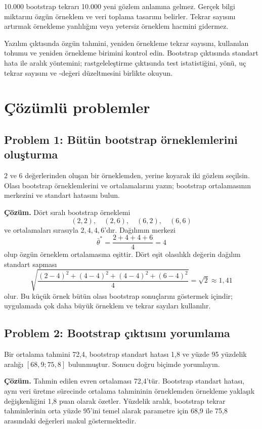 \begin{mistakebox}
10.000 bootstrap tekrarı 10.000 yeni gözlem anlamına gelmez. Gerçek bilgi
miktarını özgün örneklem ve veri toplama tasarımı belirler. Tekrar sayısını
artırmak örnekleme yanlılığını veya yetersiz örneklem hacmini gidermez.
\end{mistakebox}

\begin{outputguidebox}
Yazılım çıktısında özgün tahmini, yeniden örnekleme tekrar sayısını, kullanılan
tohumu ve yeniden örnekleme birimini kontrol edin. Bootstrap çıktısında
standart hata ile aralık yöntemini; rastgeleleştirme çıktısında test
istatistiğini, yönü, uç tekrar sayısını ve \pval-değeri düzeltmesini birlikte
okuyun.
\end{outputguidebox}

\section{Çözümlü problemler}

\subsection*{Problem 1: Bütün bootstrap örneklemlerini oluşturma}

$2$ ve $6$ değerlerinden oluşan bir örneklemden, yerine koyarak iki gözlem
seçilsin. Olası bootstrap örneklemlerini ve ortalamalarını yazın; bootstrap
ortalamasının merkezini ve standart hatasını bulun.

\textbf{Çözüm.} Dört sıralı bootstrap örneklemi
\[
(2,2),\quad(2,6),\quad(6,2),\quad(6,6)
\]
ve ortalamaları sırasıyla $2,4,4,6$'dır. Dağılımın merkezi
\[
\bar\theta^*=\frac{2+4+4+6}{4}=4
\]
olup özgün örneklem ortalamasına eşittir. Dört eşit olasılıklı değerin
dağılım standart sapması
\[
\sqrt{\frac{(2-4)^2+(4-4)^2+(4-4)^2+(6-4)^2}{4}}
=\sqrt2\approx1{,}41
\]
olur. Bu küçük örnek bütün olası bootstrap sonuçlarını göstermek içindir;
uygulamada çok daha büyük örneklem ve tekrar sayıları kullanılır.

\subsection*{Problem 2: Bootstrap çıktısını yorumlama}

Bir ortalama tahmini 72,4, bootstrap standart hatası 1,8 ve yüzde 95 yüzdelik
aralığı $[68{,}9;75{,}8]$ bulunmuştur. Sonucu doğru biçimde yorumlayın.

\textbf{Çözüm.} Tahmin edilen evren ortalaması 72,4'tür. Bootstrap standart
hatası, aynı veri üretme sürecinde ortalama tahmininin örneklemden örnekleme
yaklaşık değişkenliğini 1,8 puan olarak özetler. Yüzdelik aralık, bootstrap
tekrar tahminlerinin orta yüzde 95'ini temel alarak parametre için 68,9 ile
75,8 arasındaki değerleri makul göstermektedir.


